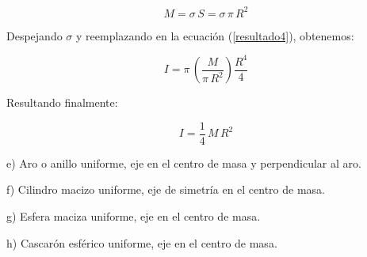 \documentclass[letter,11pt]{article}
\begin{document}
\begin{equation*}
    M = \sigma\, S = \sigma\, \pi\, R^2
\end{equation*}

Despejando $\sigma$ y reemplazando en la ecuación (\ref{resultado4}), obtenemos:

\begin{equation*}
    I = \pi\, \left( \frac{M}{\pi\, R^2} \right) \frac{R^4}{4}
\end{equation*}

Resultando finalmente:

\begin{equation}
    I = \frac{1}{4}\, M\, R^2
\end{equation}

\newpage
e) Aro o anillo uniforme, eje en el centro de masa y perpendicular al aro.

\newpage
f) Cilindro macizo uniforme, eje de simetría en el centro de masa.

\newpage
g) Esfera maciza uniforme, eje en el centro de masa.

\newpage
h) Cascarón esférico uniforme, eje en el centro de masa.
\end{document}
